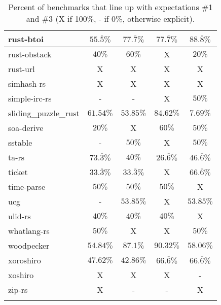 \documentclass{article}
\begin{document}
\begin{longtable}[h!]{|l|c|c|c|c|}
    rust-btoi & $55.\overline{5}\%$ & $77.\overline{7}\%$ & $77.\overline{7}\%$ & $88.\overline{8}\%$ \\ %
    \hline
    rust-obstack & $40\%$ & $60\%$ & X & $20\%$ \\ %
    \hline
    rust-url & X & X & X & X \\ %
    \hline
    simhash-rs & X & X & X & X \\ %
    \hline
    simple-irc-rs & - & - & X & $50\%$ \\ %
    \hline
    sliding\_puzzle\_rust & $61.54\%$ & $53.85\%$ & $84.62\%$ & $7.69\%$ \\ %
     \hline
    soa-derive & $20\%$ & X & $60\%$ & $50\%$ \\ %
    \hline
    sstable & - & $50\%$ & X & $50\%$ \\ %
     \hline
    ta-rs & $73.\overline{3}\%$ & $40\%$ & $26.\overline{6}\%$ & $46.\overline{6}\%$ \\ %
    \hline
    ticket & $33.\overline{3}\%$ & $33.\overline{3}\%$ & X & $66.\overline{6}\%$ \\ %
    \hline
    time-parse & $50\%$ & $50\%$ & $50\%$ & X \\ %
    \hline
    ucg & - & $53.85\%$ & X & $53.85\%$ \\ %
    \hline
    ulid-rs & $40\%$ & $40\%$ & $40\%$ & X \\ %
    \hline
    whatlang-rs & $50\%$ & X & X & $50\%$ \\ %
     \hline
    woodpecker & $54.84\%$ & $87.1\%$ & $90.32\%$ & $58.06\%$ \\ %
    \hline
    xoroshiro & $47.62\%$ & $42.86\%$ & $66.\overline{6}\%$ & $66.\overline{6}\%$ \\ %
    \hline
    xoshiro & X & X & X & - \\ %
    \hline
    zip-rs & X & - & - & X \\ %
    \hline
  \caption{Percent of benchmarks that line up with expectations \#1 and \#3 (X if 100\%, - if 0\%, otherwise explicit).}
  \label{table:qual13}
\end{longtable}
\end{document}
